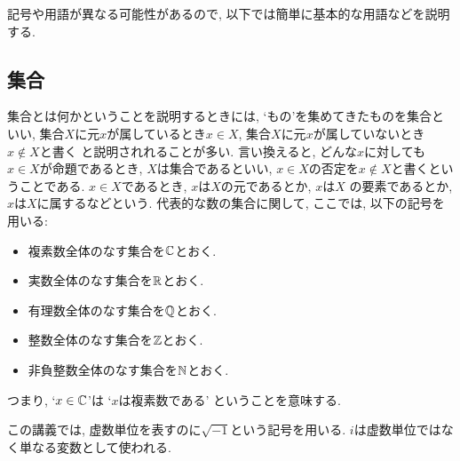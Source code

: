 記号や用語が異なる可能性があるので,
以下では簡単に基本的な用語などを説明する.

\subsection{集合}
集合とは何かということを説明するときには,
`もの'を集めてきたものを集合といい,
集合$X$に元$x$が属しているとき$x\in X$,
集合$X$に元$x$が属していないとき$x\not\in X$と書く
と説明されれることが多い.
言い換えると,
どんな$x$に対しても$x\in X$が命題であるとき,
$X$は集合であるといい,
$x\in X$の否定を$x\not\in X$と書くということである.
$x\in X$であるとき,
$x$は$X$の元であるとか,
$x$は$X$ の要素であるとか,
$x$は$X$に属するなどという.
代表的な数の集合に関して,
ここでは,
以下の記号を用いる:
\begin{itemize}
\item 複素数全体のなす集合を$\mathbb{C}$とおく.
\item 実数全体のなす集合を$\mathbb{R}$とおく.
\item 有理数全体のなす集合を$\mathbb{Q}$とおく.
\item 整数全体のなす集合を$\mathbb{Z}$とおく.
\item 非負整数全体のなす集合を$\mathbb{N}$とおく.
\end{itemize}
つまり,
`$x\in\mathbb{C}$'は
`$x$は複素数である'
ということを意味する.
\begin{remark}
この講義では, 虚数単位を表すのに$\sqrt{-1}$という記号を用いる.
$i$は虚数単位ではなく単なる変数として使われる.
\end{remark}

